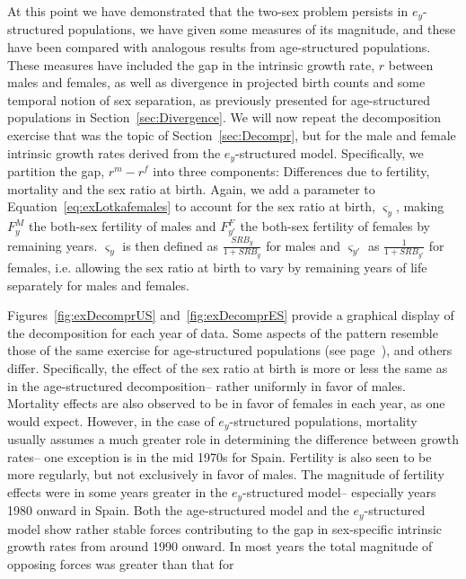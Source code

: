 \FloatBarrier
At this point we have demonstrated that the two-sex problem persists in
$e_y$-structured populations, we have given some measures of its
magnitude, and these have been compared with analogous results from
age-structured populations. These measures have included the gap in the
intrinsic growth rate, $r$ between males and females, as well as
divergence in projected birth counts and some
temporal notion of sex separation, as previously
presented for age-structured populations in Section~\ref{sec:Divergence}. We
will now repeat the decomposition exercise that was the topic of
 Section~\ref{sec:Decompr}, but for the male and female intrinsic growth rates 
 derived from the $e_y$-structured model. Specifically, we partition the 
 gap, $r^m-r^f$ into three components: Differences due to fertility, 
 mortality and the sex
ratio at birth. Again, we add a parameter to Equation~\eqref{eq:exLotkafemales}
to account for the sex ratio at birth, $\varsigma _{y}$, making $F_{y}^M$
the both-sex fertility of males and $F_{y'}^F$ the both-sex fertility of females
by remaining years. $\varsigma _{y}$ is then defined as $\frac{SRB_y}{1+SRB_y}$
for males and $\varsigma _{y'}$ as $\frac{1}{1+SRB_{y'}}$ for females, i.e.
allowing the sex ratio at birth to vary by remaining years of life separately 
for males and females.

Figures~\ref{fig:exDecomprUS} and~\ref{fig:exDecomprES} provide a graphical
display of the decomposition for each year of data. Some
aspects of the pattern resemble those of the same exercise for age-structured 
populations (see page~\pageref{fig:DecomprUS}), and others differ.
Specifically, the effect of the sex ratio at birth is more or less the same as
in the age-structured decomposition-- rather uniformly in favor of males.
Mortality effects are also observed to be in favor of females in each year, as
one would expect. However, in the case of $e_y$-structured populations,
mortality usually assumes a much greater role in determining the difference between growth
rates-- one exception is in the mid 1970s for Spain. Fertility is also seen to
be more regularly, but not exclusively in favor of males. The magnitude of
fertility effects were in some years greater in the $e_y$-structured model--
especially years 1980 onward in Spain. Both the age-structured model and the
$e_y$-structured model show rather stable forces contributing to the gap in
sex-specific intrinsic growth rates from around 1990 onward. In most years the
total magnitude of opposing forces was greater than that for

